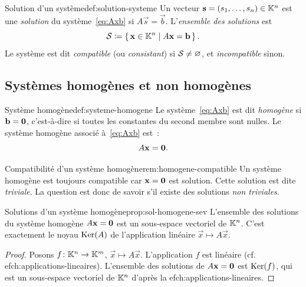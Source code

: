 \begin{definition}{Solution d'un système}{def:solution-systeme}
  Un vecteur $\mathbf{s}=(s_1,\ldots,s_n)\in{\mathbb{K}}^n$ est une \emph{solution}%
   du système~\eqref{eq:Axb} si $A\vec{s}=\vec{b}$.
  L'\emph{ensemble des solutions} est
  \[
    {\mathcal{S}} \coloneqq \left\{\,\mathbf{x}\in{\mathbb{K}}^n\;\middle|\;A\mathbf{x}=\mathbf{b}\,\right\}.
  \]
  Le système est dit \emph{compatible}
  (ou \emph{consistant}) si ${\mathcal{S}}\neq\varnothing$, et
  \emph{incompatible} sinon.
\end{definition}

\subsection{Systèmes homogènes et non homogènes}\label{subsec:homogene-non}

\begin{definition}{Système homogène}{def:systeme-homogene}
  Le système~\eqref{eq:Axb} est dit \emph{homogène}
  si $\mathbf{b}=\mathbf{0}$, c'est-à-dire si toutes les constantes du second
  membre sont nulles. Le système homogène associé à~\eqref{eq:Axb} est~:
  \begin{equation}\label{eq:systeme-homogene}
    A\mathbf{x}=\mathbf{0}.
  \end{equation}
\end{definition}

\begin{remark}{Compatibilité d'un système homogène}{rem:homogene-compatible}
  Un système homogène est toujours compatible car $\mathbf{x}=\mathbf{0}$ est
  solution. Cette solution est dite \emph{triviale}.
  La question est donc de savoir s'il existe des solutions
  \emph{non triviales}.
\end{remark}

\begin{proposition}{Solutions d'un système homogène}{prop:sol-homogene-sev}
  L'ensemble des solutions du système homogène $A\mathbf{x}=\mathbf{0}$ est un
  sous-espace vectoriel de ${\mathbb{K}}^n$. C'est
  exactement le noyau $\operatorname{Ker}(A)$ de l'application linéaire
  $\vec{x}\mapsto A\vec{x}$.
\end{proposition}

\begin{proof}
  Posons $f\colon{\mathbb{K}}^n\to{\mathbb{K}}^m$, $\vec{x}\mapsto A\vec{x}$. L'application
  $f$ est linéaire (cf.~
ef{ch:applications-lineaires}). L'ensemble des
  solutions de $A\mathbf{x}=\mathbf{0}$ est $\operatorname{Ker}(f)$, qui est un sous-espace
  vectoriel de ${\mathbb{K}}^n$ d'après la 
ef{ch:applications-lineaires}.
\end{proof}

